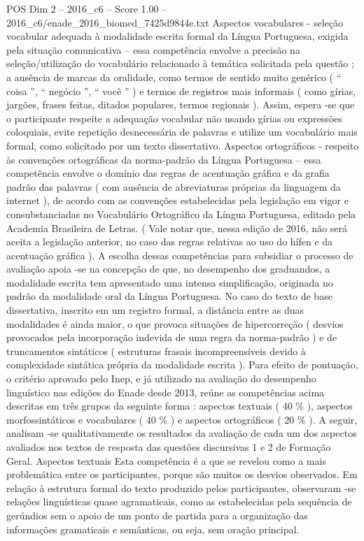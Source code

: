 \begin{textsample}{POS Dim 2 – 2016\_c6 – Score 1.00 – 2016\_c6/enade\_2016\_biomed\_7425d9844e.txt}
Aspectos vocabulares - seleção vocabular adequada à modalidade escrita formal da Língua Portuguesa, exigida pela situação comunicativa – essa competência envolve a precisão na seleção/utilização do vocabulário relacionado à temática solicitada pela questão ; a ausência de marcas da oralidade, como termos de sentido muito genérico ( “ coisa ”, “ negócio ”, “ você ” ) e termos de registros mais informais ( como gírias, jargões, frases feitas, ditados populares, termos regionais ).
Assim, espera -se que o participante respeite a adequação vocabular não usando gírias ou expressões coloquiais, evite repetição desnecessária de palavras e utilize um vocabulário mais formal, como solicitado por um texto dissertativo.
Aspectos ortográficos - respeito às convenções ortográficas da norma-padrão da Língua Portuguesa – essa competência envolve o domínio das regras de acentuação gráfica e da grafia padrão das palavras ( com ausência de abreviaturas próprias da linguagem da internet ), de acordo com as convenções estabelecidas pela legislação em vigor e consubstanciadas no Vocabulário Ortográfico da Língua Portuguesa, editado pela Academia Brasileira de Letras. ( Vale notar que, nessa edição de 2016, não será aceita a legislação anterior, no caso das regras relativas ao uso do hífen e da acentuação gráfica ).
A escolha dessas competências para subsidiar o processo de avaliação apoia -se na concepção de que, no desempenho dos graduandos, a modalidade escrita tem apresentado uma intensa simplificação, originada no padrão da modalidade oral da Língua Portuguesa.
No caso do texto de base dissertativa, inscrito em um registro formal, a distância entre as duas modalidades é ainda maior, o que provoca situações de hipercorreção ( desvios provocados pela incorporação indevida de uma regra da norma-padrão ) e de truncamentos sintáticos ( estruturas frasais incompreensíveis devido à complexidade sintática própria da modalidade escrita ).
Para efeito de pontuação, o critério aprovado pelo Inep, e já utilizado na avaliação do desempenho linguístico nas edições do Enade desde 2013, reúne as competências acima descritas em três grupos da seguinte forma : aspectos textuais ( 40 \% ), aspectos morfossintáticos e vocabulares ( 40 \% ) e aspectos ortográficos ( 20 \% ).
A seguir, analisam -se qualitativamente os resultados da avaliação de cada um dos aspectos avaliados nos textos de resposta das questões discursivas 1 e 2 de Formação Geral.
Aspectos textuais Esta competência é a que se revelou como a mais problemática entre os participantes, porque são muitos os desvios observados.
Em relação à estrutura formal do texto produzido pelos participantes, observaram -se relações linguísticas quase agramaticais, como as estabelecidas pela sequência de gerúndios sem o apoio de um ponto de partida para a organização das informações gramaticais e semânticas, ou seja, sem oração principal.

\end{textsample}
